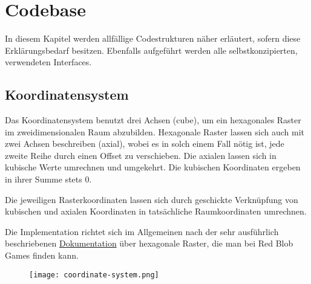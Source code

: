 \documentclass[../main.tex]{subfiles}
\begin{document}

	\section{Codebase}
	\par In diesem Kapitel werden allfällige Codestrukturen näher erläutert, sofern diese Erklärungsbedarf besitzen. Ebenfalls aufgeführt werden alle selbstkonzipierten, verwendeten Interfaces.
	
	\subsection{Koordinatensystem}
	\par Das Koordinatensystem benutzt drei Achsen (cube), um ein hexagonales Raster im zweidimensionalen Raum abzubilden. Hexagonale Raster lassen sich auch mit zwei Achsen beschreiben (axial), wobei es in solch einem Fall nötig ist, jede zweite Reihe durch einen Offset zu verschieben. Die axialen lassen sich in kubische Werte umrechnen und umgekehrt. Die kubischen Koordinaten ergeben in ihrer Summe stets 0.
	\par Die jeweiligen Rasterkoordinaten lassen sich durch geschickte Verknüpfung von kubischen und axialen Koordinaten in tatsächliche Raumkoordinaten umrechnen.
	\par Die Implementation richtet sich im Allgemeinen nach der sehr ausführlich beschriebenen \href{https://www.redblobgames.com/grids/hexagons/}{Dokumentation} über hexagonale Raster, die man bei Red Blob Games finden kann.
	\begin{figure}[H]
		\centering
		\texttt{[image: coordinate-system.png]}
	\end{figure}
\end{document}
